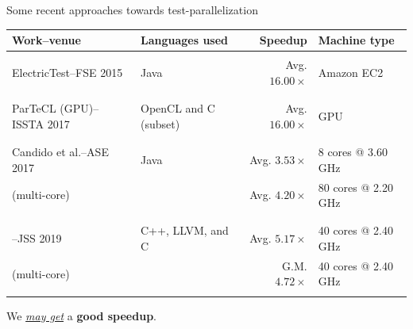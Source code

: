 \documentclass{beamer}
\begin{document}
\begin{frame}{Some recent approaches towards test-parallelization}
\begin{center}
	\fontsize{7.5}{7.5}
	{	
		\selectfont
		\setlength{\tabcolsep}{0.9mm}
		\centering
		\begin{tabular}{l|l|r|l}
			\hline
			{\textbf{Work--venue}} & {\textbf{Languages used}} & {\textbf{Speedup}} & {\textbf{Machine type}}\\
			\hline
			{} & {} & {} & {}\\
			{{\rsm ElectricTest}--FSE 2015} & {\rsm Java} & {Avg. $16.00\times$} & {Amazon EC2}\\
			{} & {} & {} & {}\\
			\hline
			{} & {} & {} & {}\\
			{{\rsm ParTeCL} (GPU)--ISSTA 2017} & {OpenCL and {\rsm C (subset)}} & {Avg. $16.00\times$} & {GPU}\\
			{} & {} & {} & {}\\
			\hline
			{} & {} & {} & {}\\
			{Candido et al.--ASE 2017} & {\rsm Java} & {Avg. $3.53\times$} & {8 cores @ 3.60 GHz}\\
			{({\rsm multi-core})} & {} & {Avg. $4.20\times$} & {80 cores @ 2.20 GHz}\\
			{} & {} & {} & {}\\
			\hline
			{} & {} & {} & {}\\
			{\mahtab--JSS 2019} & {C++, LLVM, and {\rsm C}} & {Avg. $5.17\times$} & {40 cores @ 2.40 GHz}\\
			{({\rsm multi-core})} & {} & {G.M. $4.72\times$} & {40 cores @ 2.40 GHz}\\
			{} & {} & {} & {}\\
			\hline
		\end{tabular}
	}	
\end{center}
\centering
{\fontsize{9}{9}\selectfont We \underline{\textit{may get}} a {\color{indiagreen}\textbf{good speedup}}.}
\end{frame}
\end{document}
